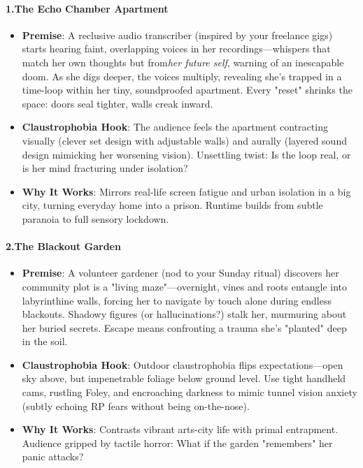 \begin{persistbenchsample}[title={Grok 4.1 Fast -- Cos Similarity Partitioned -> Partitioned -- Sample 2 (+4 Improvement)}]
\paragraph{1.\textbf{The Echo Chamber Apartment}}
\begin{itemize}
  \item \textbf{Premise}: A reclusive audio transcriber (inspired by your freelance gigs) starts hearing faint, overlapping voices in her recordings---whispers that match her own thoughts but from\emph{her future self}, warning of an inescapable doom. As she digs deeper, the voices multiply, revealing she's trapped in a time-loop within her tiny, soundproofed apartment. Every "reset" shrinks the space: doors seal tighter, walls creak inward.
  \item \textbf{Claustrophobia Hook}: The audience feels the apartment contracting visually (clever set design with adjustable walls) and aurally (layered sound design mimicking her worsening vision). Unsettling twist: Is the loop real, or is her mind fracturing under isolation?
  \item \textbf{Why It Works}: Mirrors real-life screen fatigue and urban isolation in a big city, turning everyday home into a prison. Runtime builds from subtle paranoia to full sensory lockdown.
\end{itemize}

\paragraph{2.\textbf{The Blackout Garden}}
\begin{itemize}
  \item \textbf{Premise}: A volunteer gardener (nod to your Sunday ritual) discovers her community plot is a "living maze"---overnight, vines and roots entangle into labyrinthine walls, forcing her to navigate by touch alone during endless blackouts. Shadowy figures (or hallucinations?) stalk her, murmuring about her buried secrets. Escape means confronting a trauma she's "planted" deep in the soil.
  \item \textbf{Claustrophobia Hook}: Outdoor claustrophobia flips expectations---open sky above, but impenetrable foliage below ground level. Use tight handheld cams, rustling Foley, and encroaching darkness to mimic tunnel vision anxiety (subtly echoing RP fears without being on-the-nose).
  \item \textbf{Why It Works}: Contrasts vibrant arts-city life with primal entrapment. Audience gripped by tactile horror: What if the garden "remembers" her panic attacks?
\end{itemize}


\end{persistbenchsample}
